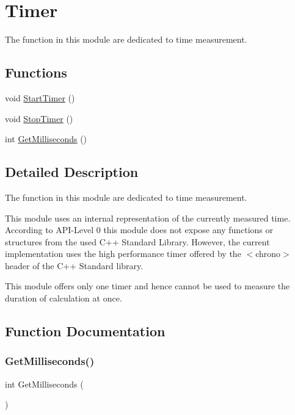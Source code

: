 \hypertarget{group__timer__group}{}\section{Timer}
\label{group__timer__group}


The function in this module are dedicated to time measurement.  


\subsection*{Functions}
\begin{DoxyCompactItemize}
\item 
void \hyperlink{group__timer__group_ga66509b494102a5c28ba6c8be3eab7733}{Start\+Timer} ()
\item 
void \hyperlink{group__timer__group_gaf3619f34a9bc0184b4578e5337069856}{Stop\+Timer} ()
\item 
int \hyperlink{group__timer__group_ga0c820f6552d69b3cdaac23e6b4662d7a}{Get\+Milliseconds} ()
\end{DoxyCompactItemize}


\subsection{Detailed Description}
The function in this module are dedicated to time measurement. 

This module uses an internal representation of the currently measured time. According to A\+P\+I-\/\+Level 0 this module does not expose any functions or structures from the used C++ Standard Library. However, the current implementation uses the high performance timer offered by the {\ttfamily $<$chrono$>$} header of the C++ Standard library.

This module offers only one timer and hence cannot be used to measure the duration of calculation at once. 

\subsection{Function Documentation}
\mbox{\label{group__timer__group_ga0c820f6552d69b3cdaac23e6b4662d7a}} 
\subsubsection{\texorpdfstring{Get\+Milliseconds()}{GetMilliseconds()}}
{\footnotesize\ttfamily int Get\+Milliseconds (\begin{DoxyParamCaption}{ }\end{DoxyParamCaption})}

